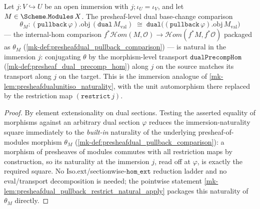 \begin{lemma}\label{mk-lem:presheafdual_pullback_restrict_natural}
  \leanok

  Let \(j : V \hookrightarrow U\) be an open immersion with \(j \mathbin{;} \iota_U = \iota_V\), and let
  \(M \in \Scheme.\mathtt{Modules}\,X\). The presheaf-level dual base-change comparison
  \[
    \theta_M : (\mathtt{pullback}\,\varphi).\mathrm{obj}\,(\mathtt{dual}\,M_{\mathrm{val}})
      \;\cong\; \mathtt{dual}\bigl((\mathtt{pullback}\,\varphi).\mathrm{obj}\,M_{\mathrm{val}}\bigr)
  \]
  --- the internal-hom comparison
  \(f^{*}\mathcal{H}om(M, \mathcal{O}) \to \mathcal{H}om(f^{*}M, f^{*}\mathcal{O})\) packaged as
  \(\theta_M\) (\ref{mk-def:presheafdual_pullback_comparison}) --- is natural in the immersion
  \(j\): conjugating \(\theta\) by the morphism-level transport \(\mathtt{dualPrecompHom}\)
  (\ref{mk-def:presheaf_dual_precomp_hom}) along \(j\) on the source matches its transport along
  \(j\) on the target. This is the immersion analogue of \ref{mk-lem:presheafdualunitiso_naturality},
  with the unit automorphism there replaced by the restriction map \((\mathtt{restrict}\,j)\).
\end{lemma}
\begin{proof}
  \leanok
  By element extensionality on dual sections. Testing the asserted equality of morphisms against an
  arbitrary dual section \(\varphi\) reduces the immersion-naturality square immediately to the
  \emph{built-in} naturality of the underlying presheaf-of-modules morphism \(\theta_M\)
  (\ref{mk-def:presheafdual_pullback_comparison}): a morphism of presheaves of modules commutes with all
  restriction maps by construction, so its naturality at the immersion \(j\), read off at \(\varphi\),
  is exactly the required square. No \(\mathrm{Iso.ext}\)/sectionwise-\(\mathtt{hom\_ext}\) reduction
  ladder and no eval/transport decomposition is needed; the pointwise statement
  \ref{mk-lem:presheafdual_pullback_restrict_natural_apply} packages this naturality of \(\theta_M\)
  directly.
\end{proof}

